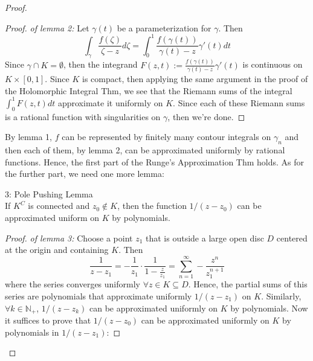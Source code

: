\begin{proof}
    \begin{proof}
        \textit{of lemma 2:} Let $\gamma(t)$ be a parameterization for $\gamma$. Then
        \[
        \int_\gamma \frac{f(\zeta)}{\zeta -z} d\zeta= \int_0^1 \frac{f(\gamma(t))}{ \gamma (t)-z} \gamma'(t)dt
        \]
        Since $\gamma \cap K=\emptyset$, then the integrand $F(z,t):= \frac{f(\gamma (t))}{ \gamma(t)-z} \gamma' (t)$ is continuous on $K\times [0,1]$. Since $K$ is compact, then applying the same argument in the proof of the Holomorphic Integral Thm, we see that the Riemann sums of the integral $\int_0^1 F(z,t)dt$ approximate it uniformly on $K$. Since each of these Riemann sums is a rational function with singularities on $\gamma$, then we're done.
    \end{proof}
    By lemma 1, $f$ can be represented by finitely many contour integrals on $\gamma_n$ and then each of them, by lemma 2, can be approximated uniformly by rational functions. Hence, the first part of the Runge's Approximation Thm holds. As for the further part, we need one more lemma:

    \begin{lemma}{3: Pole Pushing Lemma}\\
    If $K^C$ is connected and $z_0 \notin K$, then the function $1/(z-z_0)$ can be approximated uniform on $K$ by polynomials.
    \end{lemma}

    \begin{proof}
        \textit{of lemma 3:} Choose a point $z_1$ that is outside a large open disc $D$ centered at the origin and containing $K$. Then
        \[
        \frac{1}{z-z_1}= -\frac{1}{z_1} \cdot \frac{1}{1-\frac{z}{z_1}}= \sum_{n=1}^\infty -\frac{z^n}{z^{n+1}_1}
        \]
        where the series converges uniformly $\forall z\in K\subseteq D$. Hence, the partial sums of this series are polynomials that approximate uniformly $1/(z-z_1)$ on $K$. Similarly, $\forall k\in \mathbb{N}_+$, $1/(z-z_k)$ can be approximated uniformly on $K$ by polynomials. Now it suffices to prove that $1/ (z-z_0)$ can be approximated uniformly on $K$ by polynomials in $1/(z-z_1)$:


\end{proof}
\end{proof}
